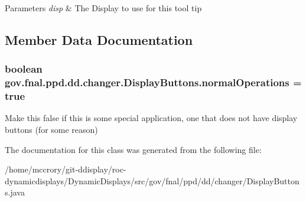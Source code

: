 \begin{DoxyParams}{Parameters}
{\em disp} & The Display to use for this tool tip \\
\hline
\end{DoxyParams}


\subsection{Member Data Documentation}
\hypertarget{classgov_1_1fnal_1_1ppd_1_1dd_1_1changer_1_1DisplayButtons_aee30976132133400c5f8cb6a48599aa9}{
\subsubsection[{normal\-Operations}]{\setlength{\rightskip}{0pt plus 5cm}boolean gov.\-fnal.\-ppd.\-dd.\-changer.\-Display\-Buttons.\-normal\-Operations = true\hspace{0.3cm}{\ttfamily [static]}}}\label{classgov_1_1fnal_1_1ppd_1_1dd_1_1changer_1_1DisplayButtons_aee30976132133400c5f8cb6a48599aa9}
Make this false if this is some special application, one that does not have display buttons (for some reason) 

The documentation for this class was generated from the following file\-:\begin{DoxyCompactItemize}
\item 
/home/mccrory/git-\/ddisplay/roc-\/dynamicdisplays/\-Dynamic\-Displays/src/gov/fnal/ppd/dd/changer/Display\-Buttons.\-java\end{DoxyCompactItemize}
